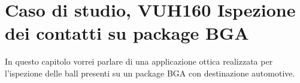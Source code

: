 \chapter{Caso di studio, VUH160 Ispezione dei contatti su package BGA}
In questo capitolo vorrei parlare di una applicazione ottica realizzata per
l'ispezione delle ball presenti su un package BGA con destinazione automotive.